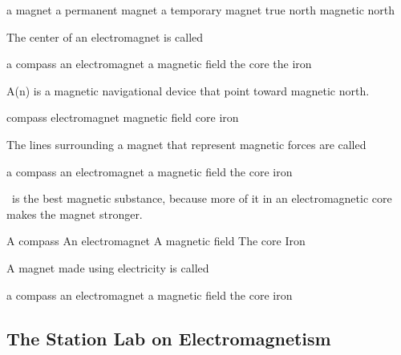 \documentclass[]{exam}
\begin{document}
\begin{questions}
\begin{randomizechoices}
    \choice a magnet
    \correctchoice a permanent magnet
    \choice a temporary magnet
    \choice true north
    \choice magnetic north
\end{randomizechoices}

\question
The center of an electromagnet is called 

\begin{randomizechoices}
    \choice a compass
    \choice an electromagnet
    \choice a magnetic field
    \correctchoice the core
    \choice the iron
\end{randomizechoices}

\question
A(n) \fillin[compass] is a magnetic navigational device that point toward magnetic north.

\begin{randomizechoices}
    \correctchoice compass
    \choice electromagnet
    \choice magnetic field
    \choice core
    \choice iron
\end{randomizechoices}

\question
The lines surrounding a magnet that represent magnetic forces are called

\begin{randomizechoices}
    \choice a compass
    \choice an electromagnet
    \correctchoice a magnetic field
    \choice the core
    \choice iron
\end{randomizechoices}

\question
\fillin\ is the best magnetic substance, because more of it in an electromagnetic core makes the magnet stronger.

\begin{randomizechoices}
    \choice A compass
    \choice An electromagnet
    \choice A magnetic field
    \choice The core
    \correctchoice Iron
\end{randomizechoices}

\question 
A magnet made using electricity is called

\begin{randomizechoices}
    \choice a compass
    \correctchoice an electromagnet
    \choice a magnetic field
    \choice the core
    \choice iron
\end{randomizechoices}


\end{questions}

\clearpage

\subsection{The Station Lab on Electromagnetism}
\end{document}
